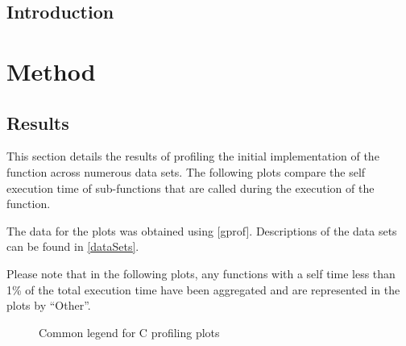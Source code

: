 \subsection{Introduction}
\label{software:algorithmProfiling:c:introduction}

\section{Method}
\label{software:algorithmProfiling:c:method}

\subsection{Results}
\label{software:algorithmProfiling:c:results}
This section details the results of profiling the initial 
implementation of the  function across
numerous data sets. The following plots compare the self execution time of
sub-functions that are called during the execution of the
 function.

The data for the plots was obtained using [gprof].
Descriptions of the data sets can be found in \autoref{dataSets}.

Please note that in the following plots, any functions with a self time less
than 1\% of the total execution time have been aggregated and are represented in
the plots by ``Other''.


\begin{figure}
    \centering
    
    \caption{Common legend for C profiling plots}
    \label{profiling:c:legend}
\end{figure}
